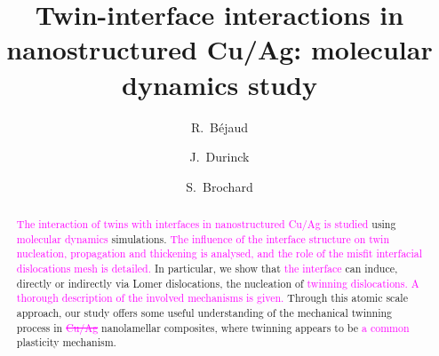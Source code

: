 \documentclass[final,3p,times,twocolumn]{elsarticle}
\begin{document}
\begin{frontmatter}



\title{Twin-interface interactions in nanostructured Cu/Ag: molecular dynamics study}


\author[pprime]{R.~Béjaud}
\author[pprime]{J.~Durinck}
\author[pprime]{S.~Brochard}



\address[pprime]{Institut Pprime, CNRS - Université de Poitiers - ENSMA, UPR 3346, Département de Physique et Mécanique des Matériaux, Bvd M. et P. Curie, SP2MI, BP 30179, 86962 Futuroscope Chasseneuil Cedex, France}


\begin{abstract}
\textcolor{magenta}{The interaction of twins with interfaces in nanostructured Cu/Ag is studied} using \textcolor{magenta}{molecular dynamics} simulations. \textcolor{magenta}{The influence of the interface structure on twin nucleation, propagation and thickening is analysed, and the role of the misfit interfacial dislocations mesh is detailed.} In particular, we show that \textcolor{magenta}{the interface} can induce, directly or indirectly via Lomer dislocations, the nucleation of \textcolor{magenta}{twinning dislocations. A thorough description of the involved mechanisms is given.} Through this atomic scale approach, our study offers some useful understanding of the mechanical twinning process in \textcolor{magenta}{\sout{Cu/Ag}} nanolamellar composites, where twinning appears to be \textcolor{magenta}{a common} plasticity mechanism.


\end{abstract}
\end{frontmatter}
\end{document}
